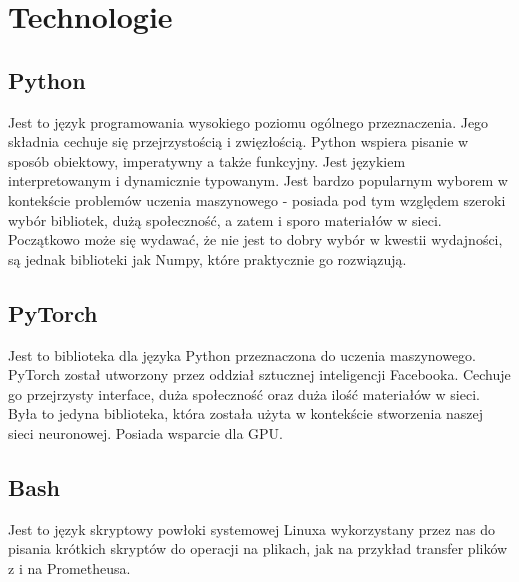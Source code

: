 \section{Technologie}

\subsection{Python}
Jest to język programowania wysokiego poziomu ogólnego przeznaczenia.
Jego składnia cechuje się przejrzystością i zwięzłością. Python wspiera pisanie w sposób obiektowy, 
imperatywny a także funkcyjny. Jest językiem interpretowanym i dynamicznie typowanym. Jest bardzo popularnym 
wyborem w kontekście problemów uczenia maszynowego - posiada pod tym względem szeroki wybór bibliotek, 
dużą społeczność, a zatem i sporo materiałów w sieci.
Początkowo może się wydawać, że nie jest to dobry wybór w kwestii wydajności, 
są jednak biblioteki jak Numpy, które praktycznie go rozwiązują.

\subsection{PyTorch}
Jest to biblioteka dla języka Python przeznaczona do uczenia maszynowego. PyTorch \cite{pytorch} został utworzony
przez oddział sztucznej inteligencji Facebooka. Cechuje go przejrzysty interface, duża społeczność
oraz duża ilość materiałów w sieci. Była to jedyna biblioteka, która została użyta w kontekście 
stworzenia naszej sieci neuronowej. Posiada wsparcie dla GPU.

\subsection{Bash}
Jest to język skryptowy powłoki systemowej Linuxa wykorzystany przez nas do pisania krótkich skryptów
do operacji na plikach, jak na przykład transfer plików z i na Prometheusa.
